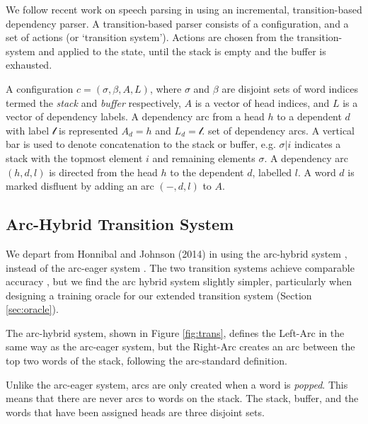 \documentclass[11pt,letterpaper]{article}
\begin{document}
We follow recent work on speech parsing in using an incremental, transition-based
dependency parser.
A transition-based parser \citep{nivre:08} consists of a configuration,
and a set of actions (or `transition system').  Actions are chosen from the
transition-system and applied to the state, until the stack is empty and the
buffer is exhausted.

A configuration $c = (\sigma, \beta, A, L)$,
where $\sigma$ and $\beta$ are disjoint sets of word
indices termed the \emph{stack} and \emph{buffer} respectively, $A$ is a
vector of head indices, and $L$ is a vector of dependency labels.  A dependency
arc from a head $h$ to a dependent $d$ with label $\mathcal{l}$ is represented $A_d=h$
and $L_d=\mathcal{l}$.
set of dependency arcs.
A vertical bar is used to denote concatenation
to the stack or buffer, e.g. $\sigma | i$ indicates a stack with the topmost
element $i$ and remaining elements $\sigma$.
A dependency arc $(h, d, l)$ is directed from the
head $h$ to the dependent $d$, labelled $l$.
A word $d$ is marked disfluent by adding an arc $(-, d, l)$ to $A$.

\subsection{Arc-Hybrid Transition System}

We depart from Honnibal and Johnson (2014) in using the arc-hybrid system \citep{kuhlmann:11},
instead of the arc-eager system \citep{nivre:03}. The two transition systems achieve
comparable accuracy \citep{goldberg:13}, but we find the arc hybrid system slightly
simpler, particularly when designing a training oracle for our extended transition
system (Section \ref{sec:oracle}).

The arc-hybrid system, shown in Figure \ref{fig:trans}, defines the Left-Arc in
the same way as the \citet{nivre:03}
arc-eager system, but the Right-Arc creates an arc between the top two words of
the stack, following the arc-standard definition.

Unlike the arc-eager system,
arcs are only created when a word is \emph{popped}.
This means that there are never arcs to words on the stack.
The stack, buffer, and the words that have been assigned heads are three disjoint
sets.
\end{document}

